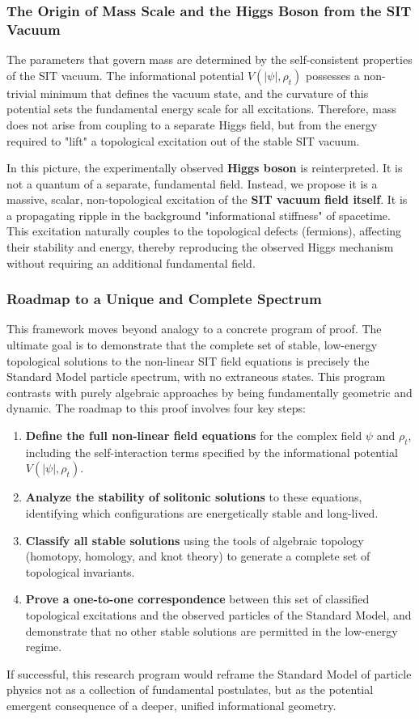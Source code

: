 \documentclass[american,11pt,letterpaper]{article}
\begin{document}
\subsubsection{The Origin of Mass Scale and the Higgs Boson from the SIT Vacuum}
The parameters that govern mass are determined by the self-consistent properties of the SIT vacuum. The informational potential $V(|\psi|, \rho_t)$ possesses a non-trivial minimum that defines the vacuum state, and the curvature of this potential sets the fundamental energy scale for all excitations. Therefore, mass does not arise from coupling to a separate Higgs field, but from the energy required to "lift" a topological excitation out of the stable SIT vacuum.

In this picture, the experimentally observed \textbf{Higgs boson} is reinterpreted. It is not a quantum of a separate, fundamental field. Instead, we propose it is a massive, scalar, non-topological excitation of the \textbf{SIT vacuum field itself}. It is a propagating ripple in the background "informational stiffness" of spacetime. This excitation naturally couples to the topological defects (fermions), affecting their stability and energy, thereby reproducing the observed Higgs mechanism without requiring an additional fundamental field.

\subsubsection{Roadmap to a Unique and Complete Spectrum}

This framework moves beyond analogy to a concrete program of proof. The ultimate goal is to demonstrate that the complete set of stable, low-energy topological solutions to the non-linear SIT field equations is precisely the Standard Model particle spectrum, with no extraneous states. This program contrasts with purely algebraic approaches by being fundamentally geometric and dynamic. The roadmap to this proof involves four key steps:
\begin{enumerate}
    \item \textbf{Define the full non-linear field equations} for the complex field $\psi$ and $\rho_t$, including the self-interaction terms specified by the informational potential $V(|\psi|, \rho_t)$.
    \item \textbf{Analyze the stability of solitonic solutions} to these equations, identifying which configurations are energetically stable and long-lived.
    \item \textbf{Classify all stable solutions} using the tools of algebraic topology (homotopy, homology, and knot theory) to generate a complete set of topological invariants.
    \item \textbf{Prove a one-to-one correspondence} between this set of classified topological excitations and the observed particles of the Standard Model, and demonstrate that no other stable solutions are permitted in the low-energy regime.
\end{enumerate}
If successful, this research program would reframe the Standard Model of particle physics not as a collection of fundamental postulates, but as the potential emergent consequence of a deeper, unified informational geometry.
\end{document}
